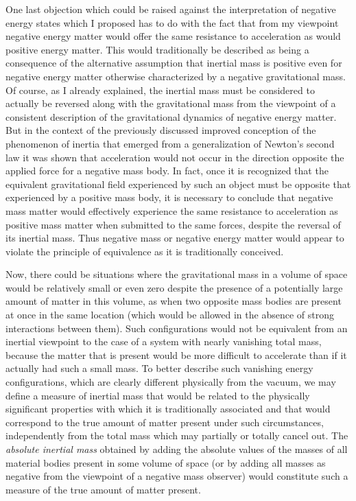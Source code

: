 \documentclass[notitlepage,12pt]{report}
\begin{document}
One last objection which could be raised against the interpretation of negative energy states which I proposed has to do with the fact that from my viewpoint negative energy matter would offer the same resistance to acceleration as would positive energy matter. This would traditionally be described as being a consequence of the alternative assumption that inertial mass is positive even for negative energy matter otherwise characterized by a negative gravitational mass. Of course, as I already explained, the inertial mass must be considered to actually be reversed along with the gravitational mass from the viewpoint of a consistent description of the gravitational dynamics of negative energy matter. But in the context of the previously discussed improved conception of the phenomenon of inertia that emerged from a generalization of Newton's second law it was shown that acceleration would not occur in the direction opposite the applied force for a negative mass body. In fact, once it is recognized that the equivalent gravitational field experienced by such an object must be opposite that experienced by a positive mass body, it is necessary to conclude that negative mass matter would effectively experience the same resistance to acceleration as positive mass matter when submitted to the same forces, despite the reversal of its inertial mass. Thus negative mass or negative energy matter would appear to violate the principle of equivalence as it is traditionally conceived.

Now, there could be situations where the gravitational mass in a volume of space would be relatively small or even zero despite the presence of a potentially large amount of matter in this volume, as when two opposite mass bodies are present at once in the same location (which would be allowed in the absence of strong interactions between them). Such configurations would not be equivalent from an inertial viewpoint to the case of a system with nearly vanishing total mass, because the matter that is present would be more difficult to accelerate than if it actually had such a small mass. To better describe such vanishing energy configurations, which are clearly different physically from the vacuum, we may define a measure of inertial mass that would be related to the physically significant properties with which it is traditionally associated and that would correspond to the true amount of matter present under such circumstances, independently from the total mass which may partially or totally cancel out. The \textit{absolute inertial mass} obtained by adding the absolute values of the masses of all material bodies present in some volume of space (or by adding all masses as negative from the viewpoint of a negative mass observer) would constitute such a measure of the true amount of matter present.
\end{document}
